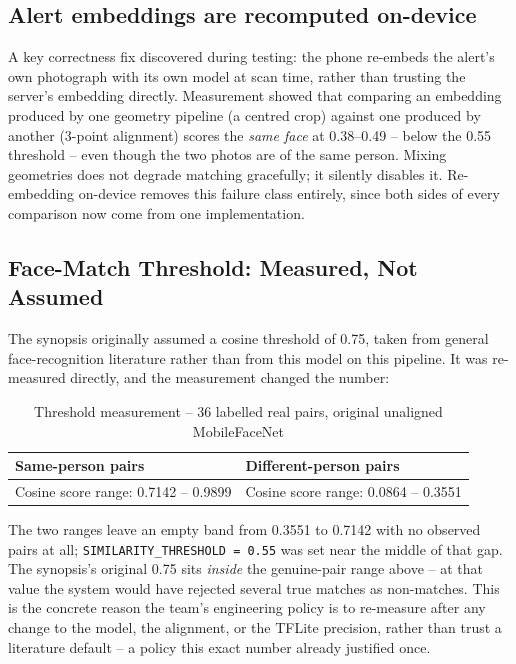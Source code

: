 \documentclass[12pt,a4paper,oneside]{report}
\newcommand{\code}[1]{\texttt{#1}}
\begin{document}
\subsection{Alert embeddings are recomputed on-device}
\label{sec:reembed}

A key correctness fix discovered during testing: the phone re-embeds the
alert's own photograph with its own model at scan time, rather than trusting
the server's embedding directly. Measurement showed that comparing an
embedding produced by one geometry pipeline (a centred crop) against one
produced by another (3-point alignment) scores the \emph{same face} at
0.38--0.49 -- below the 0.55 threshold -- even though the two photos are of
the same person. Mixing geometries does not degrade matching gracefully; it
silently disables it. Re-embedding on-device removes this failure class
entirely, since both sides of every comparison now come from one
implementation.

\subsection{Face-Match Threshold: Measured, Not Assumed}
\label{sec:threshold-measurement}

The synopsis originally assumed a cosine threshold of 0.75, taken from
general face-recognition literature rather than from this model on this
pipeline. It was re-measured directly, and the measurement changed the
number:

\begin{table}[H]
\centering
\caption{Threshold measurement -- 36 labelled real pairs, original unaligned MobileFaceNet}
\begin{tabular}{|p{5.4cm}|p{5.4cm}|}
\hline
\textbf{Same-person pairs} & \textbf{Different-person pairs} \\
\hline
Cosine score range: 0.7142 -- 0.9899 & Cosine score range: 0.0864 -- 0.3551 \\
\hline
\end{tabular}
\end{table}

The two ranges leave an empty band from 0.3551 to 0.7142 with no observed
pairs at all; \code{SIMILARITY\_THRESHOLD = 0.55} was set near the middle
of that gap. The synopsis's original 0.75 sits \emph{inside} the genuine-pair
range above -- at that value the system would have rejected several true
matches as non-matches. This is the concrete reason the team's engineering
policy is to re-measure after any change to the model, the alignment, or
the TFLite precision, rather than trust a literature default -- a policy
this exact number already justified once.
\end{document}
